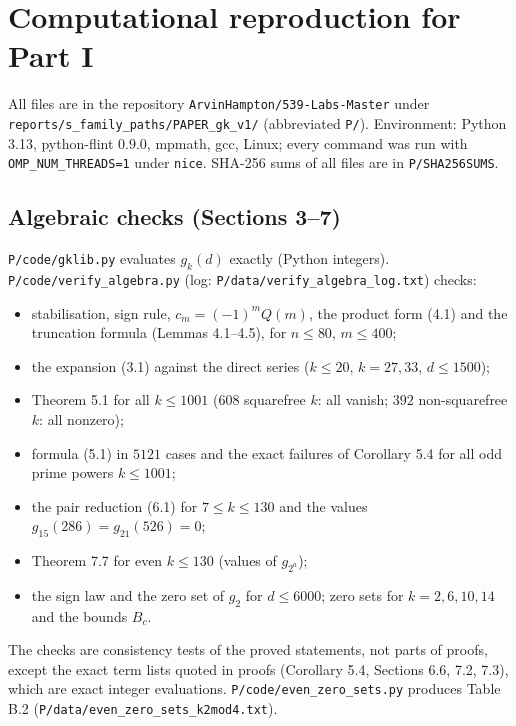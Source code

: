\section{Computational reproduction for Part I}\label{computational-reproduction-for-part-i}

All files are in the repository \texttt{ArvinHampton/539-Labs-Master} under \texttt{reports/s\_family\_paths/PAPER\_gk\_v1/} (abbreviated \texttt{P/}). Environment: Python 3.13, python-flint 0.9.0, mpmath, gcc, Linux; every command was run with \texttt{OMP\_NUM\_THREADS=1} under \texttt{nice}. SHA-256 sums of all files are in \texttt{P/SHA256SUMS}.

\subsection{Algebraic checks (Sections 3--7)}\label{algebraic-checks-sections-37}

\texttt{P/code/gklib.py} evaluates \(g_k(d)\) exactly (Python integers). \texttt{P/code/verify\_algebra.py} (log: \texttt{P/data/verify\_algebra\_log.txt}) checks:

\begin{itemize}
\tightlist
\item
  stabilisation, sign rule, \(c_m=(-1)^mQ(m)\), the product form (4.1) and the truncation formula (Lemmas 4.1--4.5), for \(n\le80\), \(m\le400\);
\item
  the expansion (3.1) against the direct series (\(k\le20\), \(k=27,33\), \(d\le1500\));
\item
  Theorem 5.1 for all \(k\le1001\) (\(608\) squarefree \(k\): all vanish; \(392\) non-squarefree \(k\): all nonzero);
\item
  formula (5.1) in \(5121\) cases and the exact failures of Corollary 5.4 for all odd prime powers \(k\le1001\);
\item
  the pair reduction (6.1) for \(7\le k\le130\) and the values \(g_{15}(286)=g_{21}(526)=0\);
\item
  Theorem 7.7 for even \(k\le130\) (values of \(g_{2^a}\));
\item
  the sign law and the zero set of \(g_2\) for \(d\le6000\); zero sets for \(k=2,6,10,14\) and the bounds \(B_c\).
\end{itemize}

The checks are consistency tests of the proved statements, not parts of proofs, except the exact term lists quoted in proofs (Corollary 5.4, Sections 6.6, 7.2, 7.3), which are exact integer evaluations. \texttt{P/code/even\_zero\_sets.py} produces Table B.2 (\texttt{P/data/even\_zero\_sets\_k2mod4.txt}).

